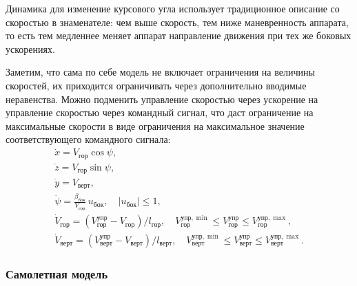 \documentclass[a4paper,12pt]{article}
\begin{document}
Динамика для изменение курсового угла использует традиционное описание со скоростью в знаменателе: чем выше скорость, тем ниже маневренность аппарата, то есть тем медленнее меняет аппарат направление движения при тех же боковых ускорениях.

Заметим, что сама по себе модель не включает ограничения на величины скоростей, их приходится ограничивать через дополнительно вводимые неравенства. Можно подменить управление скоростью через ускорение на управление скоростью через командный сигнал, что даст ограничение на максимальные скорости в виде ограничения на максимальное значение соответствующего командного сигнала:
\begin{equation*}
  \begin{array}{l}
    \dot x = V_\text{гор} \cos \psi, \\[0.75ex]
    \dot z = V_\text{гор} \sin \psi, \\[0.75ex]
    \dot y = V_\text{верт}, \\[0.75ex]
    \dot \psi   = \frac{\beta_\text{бок}}{V_\text{гор}} \, u_\text{бок}, \quad |u_\text{бок}| \leqslant 1, \\[0.75ex]
    \dot V_\text{гор} = (V^\text{упр}_\text{гор} - V_\text{гор}) / l_\text{гор}, \quad  
      V^{\text{упр},\min}_\text{гор} \leqslant V^\text{упр}_\text{гор} \leqslant V^{\text{упр},\max}_\text{гор}, \\[0.75ex]
    \dot V_\text{верт} = (V^\text{упр}_\text{верт} - V_\text{верт}) / l_\text{верт}, \quad  
      V^{\text{упр},\min}_\text{верт} \leqslant V^\text{упр}_\text{верт} \leqslant V^{\text{упр},\max}_\text{верт}.
  \end{array}
\end{equation*}


\subsubsection{Самолетная модель}
\end{document}
